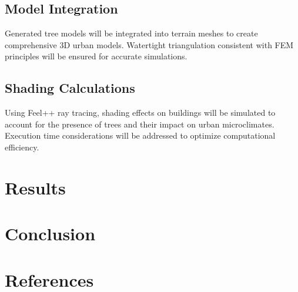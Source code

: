 \documentclass[12pt]{article}
\begin{document}
\subsection{Model Integration}
Generated tree models will be integrated into terrain meshes to create comprehensive 
3D urban models. Watertight triangulation consistent with FEM principles will be ensured 
for accurate simulations.

\subsection{Shading Calculations}
Using Feel++ ray tracing, shading effects on buildings will be simulated to account for the presence 
of trees and their impact on urban microclimates. Execution time considerations will be 
addressed to optimize computational efficiency.

\newpage

\section{Results}


\newpage

\section{Conclusion}


\newpage

\section{References}


\end{document}
